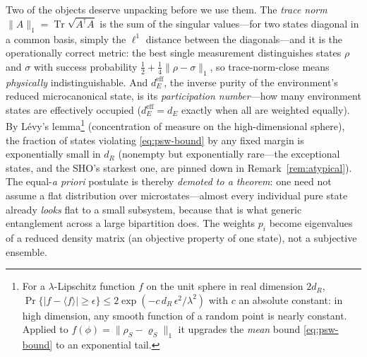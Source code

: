 \documentclass[11pt,a4paper]{article}
\theoremstyle{definition}
\begin{document}
Two of the objects deserve unpacking before we use them. The \emph{trace norm}
$\lVert A\rVert_1=\operatorname{Tr}\sqrt{A^{\dagger}A}$ is the sum of the
singular values---for two states diagonal in a common basis, simply the
$\ell^{1}$ distance between the diagonals---and it is the operationally correct
metric: the best single measurement distinguishes states $\rho$ and $\sigma$
with success probability $\tfrac12+\tfrac14\lVert\rho-\sigma\rVert_1$, so
trace-norm-close means \emph{physically} indistinguishable. And
$d_E^{\mathrm{eff}}$, the inverse purity of the environment's reduced
microcanonical state, is its \emph{participation number}---how many environment
states are effectively occupied ($d_E^{\mathrm{eff}}=d_E$ exactly when all are
weighted equally). By L\'evy's lemma\footnote{For a $\lambda$-Lipschitz function
$f$ on the unit sphere in real dimension $2d_R$,
$\Pr\{|f-\langle f\rangle|\ge\epsilon\}\le 2\exp(-c\,d_R\,\epsilon^{2}/\lambda^{2})$
with $c$ an absolute constant: in high dimension, any smooth function of a
random point is nearly constant. Applied to
$f(\phi)=\lVert\rho_S-\varrho_S\rVert_1$ it upgrades the \emph{mean} bound
\eqref{eq:psw-bound} to an exponential tail.} (concentration of measure on the
high-dimensional sphere), the fraction of states violating
\eqref{eq:psw-bound} by any fixed margin is
exponentially small in $d_R$ (nonempty but exponentially rare---the exceptional
states, and the SHO's starkest one, are pinned down in
Remark~\ref{rem:atypical}). The equal-\emph{a priori} postulate is thereby
\emph{demoted to a theorem}: one need not assume a flat distribution over
microstates---almost every individual pure state already \emph{looks} flat to a
small subsystem, because that is what generic entanglement across a large
bipartition does. The weights $p_i$ become eigenvalues of a reduced density
matrix (an objective property of one state), not a subjective ensemble.
\end{document}

